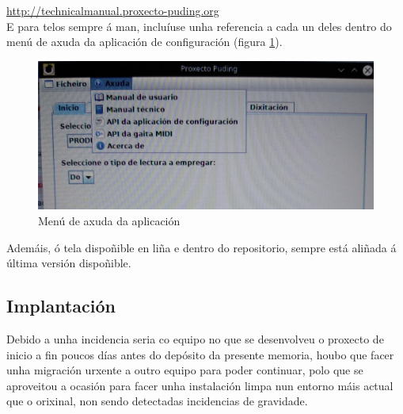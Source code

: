  \url{http://technicalmanual.proxecto-puding.org} \\
 
 E para telos sempre á man, incluíuse unha referencia a cada un deles dentro do
 menú de axuda da aplicación de configuración (figura \ref{figura:Axuda}). \\
 
 \begin{figure}[htbp]
  \centering
  \includegraphics[scale=0.2,keepaspectratio=true]{./imagenes/axuda.jpg}
  \caption{Menú de axuda da aplicación}
  \label{figura:Axuda}
 \end{figure}
 
 Ademáis, ó tela dispoñible en liña e dentro do repositorio, sempre está aliñada
 á última versión dispoñible.
 
 \subsection{Implantación}
 
 Debido a unha incidencia seria co equipo no que se desenvolveu o proxecto de
 inicio a fin poucos días antes do depósito da presente memoria, houbo que facer
 unha migración urxente a outro equipo para poder continuar, polo que se
 aproveitou a ocasión para facer unha instalación limpa nun entorno máis actual
 que o orixinal, non sendo detectadas incidencias de gravidade.
